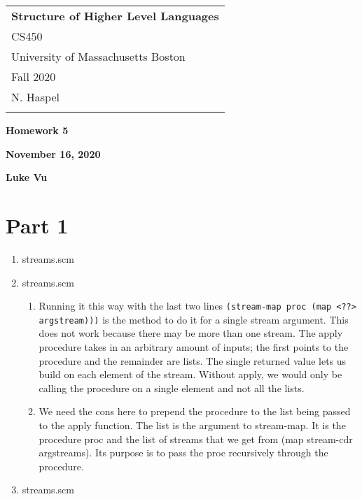 \documentclass[a4paper,12pt]{article}
\begin{document}
	\thispagestyle{empty}
	
	\begin{tabular}{p{15.5cm}}
		{\large \bf Structure of Higher Level Languages} \\ CS450 \\
		University of Massachusetts Boston \\ Fall 2020  \\ N. Haspel\\
		\hline
		\\
	\end{tabular}

	\vspace*{0.1cm}
	
	\begin{center}
		{\Large \bf Homework 5}
		\vspace{1mm}
		
		{\bf November 16, 2020}
		\vspace{1mm}
		
		{\bf Luke Vu}	
	\end{center} 

	\vspace*{0.5cm}
	
\section{Part 1}
\begin{enumerate}
\item streams.scm
\item streams.scm
\begin{enumerate}
\item Running it this way with the last two lines \texttt{(stream-map proc (map <??> argstream)))} is the method to do it for a single stream argument. This does not work because there may be more than one stream. The apply procedure takes in an arbitrary amount of inputs; the first points to the procedure and the remainder are lists. The single returned value lets us build on each element of the stream. Without apply, we would only be calling the procedure on a single element and not all the lists.
\item We need the cons here to prepend the procedure to the list being passed to the apply function. The list is the argument to stream-map. It is the procedure proc and the list of streams that we get from (map stream-cdr argstreams). Its purpose is to pass the proc recursively through the procedure.
\end{enumerate}
\item streams.scm
\end{enumerate}
\newpage
\end{document}
